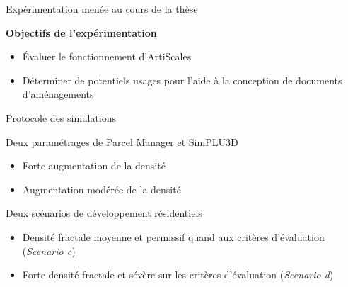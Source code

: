 \documentclass[xcolor=table]{beamer}
\begin{document}
\begin{frame}{Expérimentation menée au cours de la thèse}
	\begin{block}
		\textbf{Objectifs de l'expérimentation}\\
		\begin{itemize}
			\item Évaluer le fonctionnement d'ArtiScales
			\item Déterminer de potentiels usages pour l'aide à la conception de documents d'aménagements
		\end{itemize}
	\end{block}
\end{frame}

\begin{frame}{Protocole des simulations}
	\begin{block}{Deux paramétrages de Parcel Manager et SimPLU3D}
		\begin{itemize}
			\item Forte augmentation de la densité
			\item Augmentation modérée de la densité
		\end{itemize}
	\end{block}
	\begin{block}{Deux scénarios de développement résidentiels}
		\begin{itemize}
			\item Densité fractale moyenne et permissif quand aux critères d'évaluation (\textit{Scenario c})
			\item Forte densité fractale et sévère sur les critères d'évaluation (\textit{Scenario d})
		\end{itemize}
	\end{block}
\end{frame}
\end{document}
